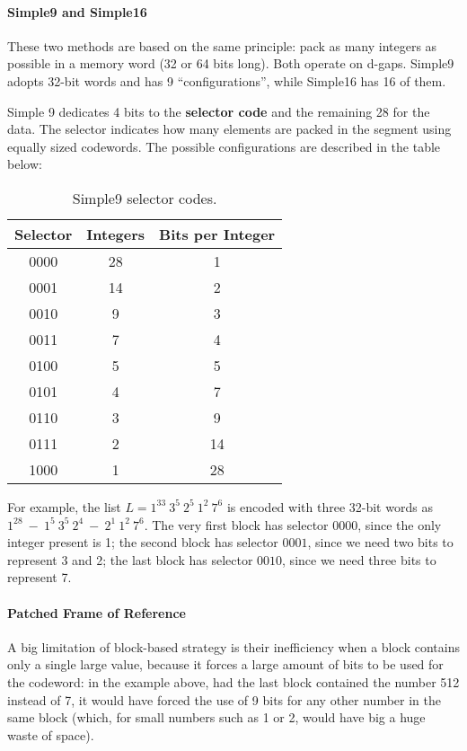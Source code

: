 \paragraph{Simple9 and Simple16}

These two methods are based on the same principle: pack as many integers as possible in a memory word (32 or 64 bits long). Both operate on d-gaps. Simple9 adopts 32-bit words and has 9 ``configurations'', while Simple16 has 16 of them.

Simple 9 dedicates 4 bits to the \textbf{selector code} and the remaining 28 for the data. The selector indicates how many elements are packed in the segment using equally sized codewords. The possible configurations are described in the table below:

\begin{table}[!ht]
    \centering
    \begin{tabular}{c|c|c}
        \textbf{Selector} & \textbf{Integers} & \textbf{Bits per Integer} \\
        \hline
        \hline
        0000 & 28 & 1 \\
        0001 & 14 & 2 \\
        0010 & 9 & 3 \\
        0011 & 7 & 4 \\
        0100 & 5 & 5 \\
        0101 & 4 & 7 \\
        0110 & 3 & 9 \\
        0111 & 2 & 14 \\
        1000 & 1 & 28 \\    
    \end{tabular}
    \caption{Simple9 selector codes.}
    \label{tab:simple9}
\end{table}
For example, the list $L = 1^{33} \ 3^5 \ 2^5 \ 1^2 \ 7^6$ is encoded with three 32-bit words as $1^{28} \ - \ 1^5 \ 3^5 \ 2^4 \ - \ 2^1 \ 1^2 \ 7^6$. The very first block has selector $0000$, since the only integer present is 1; the second block has selector $0001$, since we need two bits to represent 3 and 2; the last block has selector $0010$, since we need three bits to represent 7.

\paragraph{Patched Frame of Reference}

A big limitation of block-based strategy is their inefficiency when a block contains only a single large value, because it forces a large amount of bits to be used for the codeword: in the example above, had the last block contained the number 512 instead of 7, it would have forced the use of 9 bits for any other number in the same block (which, for small numbers such as 1 or 2, would have big a huge waste of space).

